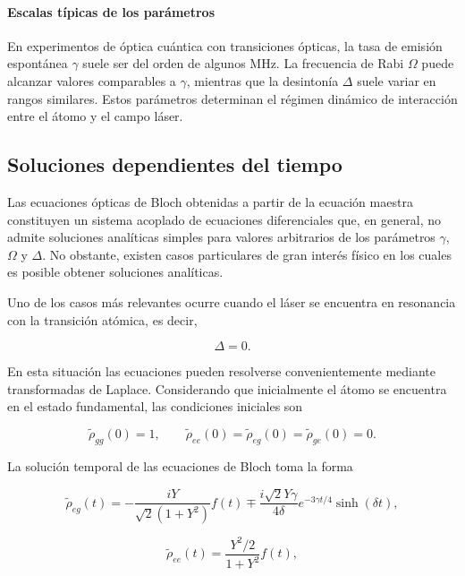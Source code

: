 \documentclass[11pt]{report}
\begin{document}
\paragraph{Escalas típicas de los parámetros}

En experimentos de óptica cuántica con transiciones ópticas, la tasa de emisión espontánea $\gamma$ suele ser del orden de algunos MHz. La frecuencia de Rabi $\Omega$ puede alcanzar valores comparables a $\gamma$, mientras que la desintonía $\Delta$ suele variar en rangos similares. Estos parámetros determinan el régimen dinámico de interacción entre el átomo y el campo láser.

\subsection{Soluciones dependientes del tiempo}

Las ecuaciones ópticas de Bloch obtenidas a partir de la ecuación maestra constituyen un sistema acoplado de ecuaciones diferenciales que, en general, no admite soluciones analíticas simples para valores arbitrarios de los parámetros $\gamma$, $\Omega$ y $\Delta$. No obstante, existen casos particulares de gran interés físico en los cuales es posible obtener soluciones analíticas.

Uno de los casos más relevantes ocurre cuando el láser se encuentra en resonancia con la transición atómica, es decir,

\begin{equation}
\Delta = 0 .
\end{equation}

En esta situación las ecuaciones pueden resolverse convenientemente mediante transformadas de Laplace. Considerando que inicialmente el átomo se encuentra en el estado fundamental, las condiciones iniciales son

\begin{equation}
\tilde{\rho}_{gg}(0)=1, 
\qquad
\tilde{\rho}_{ee}(0)=\tilde{\rho}_{eg}(0)=\tilde{\rho}_{ge}(0)=0 .
\end{equation}

La solución temporal de las ecuaciones de Bloch toma la forma

\begin{equation}
\tilde{\rho}_{eg}(t)
=
-\frac{iY}{\sqrt{2}(1+Y^2)}f(t)
\mp
\frac{i\sqrt{2}Y\gamma}{4\delta}
e^{-3\gamma t/4}\sinh(\delta t),
\end{equation}

\begin{equation}
\tilde{\rho}_{ee}(t)
=
\frac{Y^2/2}{1+Y^2}f(t),
\end{equation}
\end{document}
